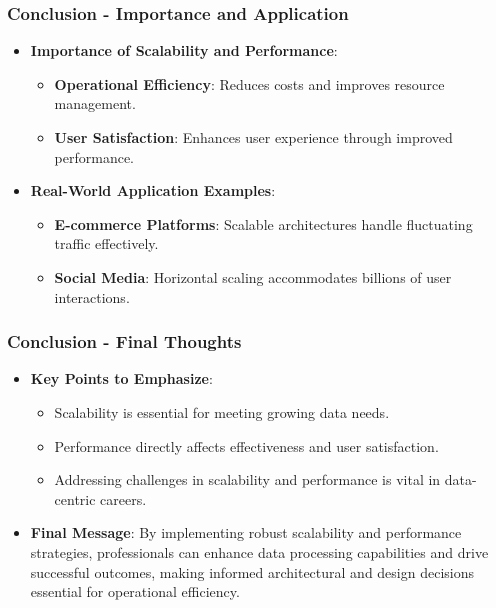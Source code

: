 \documentclass[aspectratio=169]{beamer}
\begin{document}
\begin{frame}[fragile]
    \frametitle{Conclusion - Importance and Application}
    \begin{itemize}
        \item \textbf{Importance of Scalability and Performance}:
        \begin{itemize}
            \item \textbf{Operational Efficiency}: Reduces costs and improves resource management.
            \item \textbf{User Satisfaction}: Enhances user experience through improved performance.
        \end{itemize}

        \item \textbf{Real-World Application Examples}:
        \begin{itemize}
            \item \textbf{E-commerce Platforms}: Scalable architectures handle fluctuating traffic effectively.
            \item \textbf{Social Media}: Horizontal scaling accommodates billions of user interactions.
        \end{itemize}
    \end{itemize}
\end{frame}

\begin{frame}[fragile]
    \frametitle{Conclusion - Final Thoughts}
    \begin{itemize}
        \item \textbf{Key Points to Emphasize}:
        \begin{itemize}
            \item Scalability is essential for meeting growing data needs.
            \item Performance directly affects effectiveness and user satisfaction.
            \item Addressing challenges in scalability and performance is vital in data-centric careers.
        \end{itemize}

        \item \textbf{Final Message}:
        By implementing robust scalability and performance strategies, professionals can enhance data processing capabilities and drive successful outcomes, making informed architectural and design decisions essential for operational efficiency.
    \end{itemize}
\end{frame}
\end{document}
